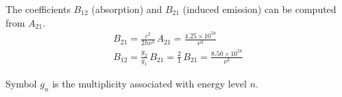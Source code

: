 \documentclass[12pt]{article}
\begin{document}
\noindent
The coefficients $B_{12}$ (absorption) and $B_{21}$ (induced emission) can be computed from $A_{21}$.
\begin{gather*}
B_{21}=\frac{c^2}{2h\nu^3}\,A_{21}=
\frac{4.25\times10^{58}}{\nu^3}
\\[2ex]
B_{12}=\frac{g_2}{g_1}\,B_{21}=\frac{2}{1}\,B_{21}
=\frac{8.50\times10^{58}}{\nu^3}
\end{gather*}

\noindent
Symbol $g_n$ is the multiplicity associated with energy level $n$.
\end{document}
